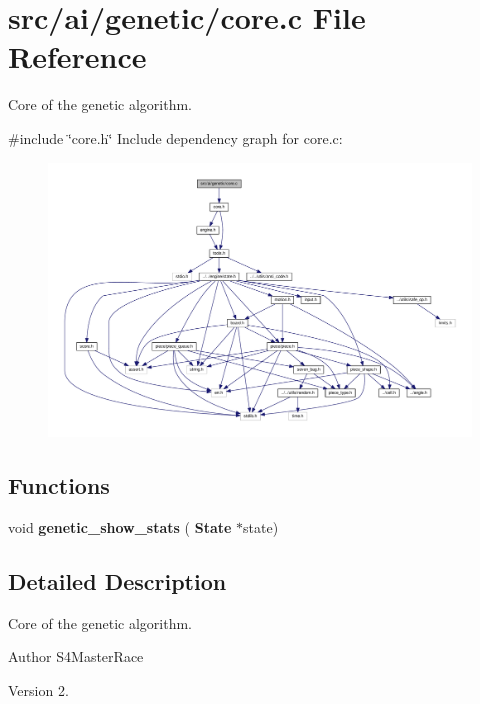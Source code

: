 \section{src/ai/genetic/core.c File Reference}
\label{core_8c}


Core of the genetic algorithm.  


{\ttfamily \#include \char`\"{}core.\+h\char`\"{}}\newline
Include dependency graph for core.\+c\+:
\nopagebreak
\begin{figure}[H]
\begin{center}
\leavevmode
\includegraphics[width=350pt]{core_8c__incl}
\end{center}
\end{figure}
\subsection*{Functions}
\begin{DoxyCompactItemize}
\item 
void \textbf{ genetic\+\_\+show\+\_\+stats} (\textbf{ State} $\ast$state)
\end{DoxyCompactItemize}


\subsection{Detailed Description}
Core of the genetic algorithm. 

\begin{DoxyAuthor}{Author}
S4\+Master\+Race 
\end{DoxyAuthor}
\begin{DoxyVersion}{Version}
2. 
\end{DoxyVersion}


